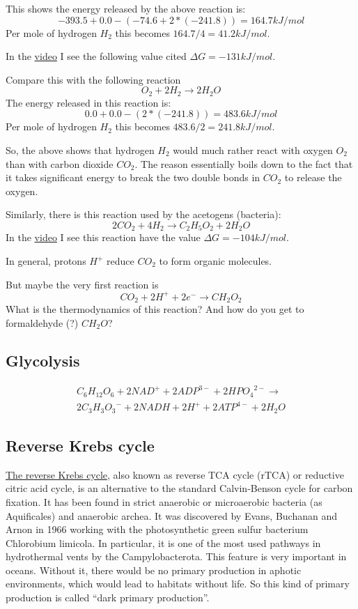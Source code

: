 \documentclass{article}
\begin{document}
This shows the energy released by the above reaction is:
\[
    -393.5 + 0.0 - (-74.6 + 2*(-241.8)) = 164.7 kJ/mol
\]
Per mole of hydrogen $H_2$ this becomes $164.7/4 = 41.2 kJ/mol$.

In the \href{https://www.youtube.com/watch?v=FWVAyAnrhXU}{video} I see the following value
cited $\Delta G = -131 kJ/mol$.

Compare this with the following reaction
\[
    O_2 + 2H_2 \rightarrow 2H_2O
\]
The energy released in this reaction is:
\[
    0.0 + 0.0 - (2*(-241.8)) = 483.6 kJ/mol
\]
Per mole of hydrogen $H_2$ this becomes $483.6/2 = 241.8 kJ/mol$.

So, the above shows that hydrogen $H_2$ would much rather react with oxygen $O_2$ than
with carbon dioxide $CO_2$. The reason essentially boils down to the fact that it takes
significant energy to break the two double bonds in $CO_2$ to release the oxygen.

Similarly, there is this reaction used by the acetogens (bacteria):
\[
    2CO_2 + 4H_2 \rightarrow C_2H_5O_2 + 2H_2O
\]
In the \href{https://www.youtube.com/watch?v=FWVAyAnrhXU}{video} I see this reaction have
the value $\Delta G = -104 kJ/mol$.

In general, protons $H^+$ reduce $CO_2$ to form organic molecules.

But maybe the very first reaction is
\[
    CO_2 + 2H^+ + 2e^- \rightarrow CH_2O_2
\]
What is the thermodynamics of this reaction?
And how do you get to formaldehyde (?) $CH_2O$?

\subsection{Glycolysis}
\[
    \begin{split}
    C_6H_{12}O_6 + 2{NAD}^+ + 2{ADP}^{3-} + 2{HPO_4}^{2-} \rightarrow \\
    2{C_3H_3O_3}^- + 2NADH + 2H^+ + 2{ATP}^{4-} + 2H_2O
    \end{split}
\]

\subsection{Reverse Krebs cycle}
\href{https://en.wikipedia.org/wiki/Biological_carbon_fixation}{The reverse Krebs cycle},
also known as reverse TCA cycle (rTCA) or reductive citric acid
cycle, is an alternative to the standard Calvin-Benson cycle for carbon fixation. It has
been found in strict anaerobic or microaerobic bacteria (as Aquificales) and anaerobic
archea. It was discovered by Evans, Buchanan and Arnon in 1966 working with the
photosynthetic green sulfur bacterium Chlorobium limicola. In particular, it is one of
the most used pathways in hydrothermal vents by the Campylobacterota. This feature is
very important in oceans. Without it, there would be no primary production in aphotic
environments, which would lead to habitats without life. So this kind of primary
production is called ``dark primary production''.
\end{document}

